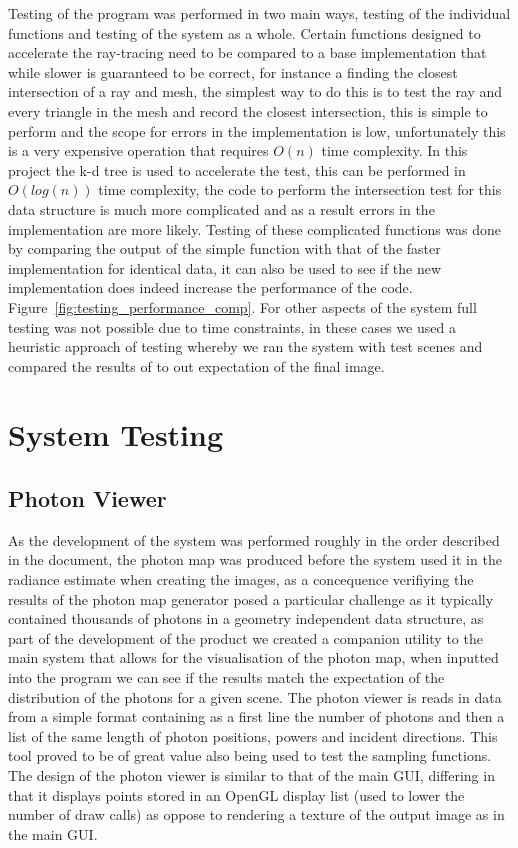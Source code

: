Testing of the program was performed in two main ways, testing of the individual functions and testing of the system as a whole.
Certain functions designed to accelerate the ray-tracing need to be compared to a base implementation that while slower is
guaranteed to be correct, for instance a finding the closest intersection of a ray and mesh, the simplest way to do this
is to test the ray and every triangle in the mesh and record the closest intersection, this is simple to perform and
the scope for errors in the implementation is low, unfortunately this is a very expensive operation that requires $O(n)$
time complexity. In this project the k-d tree is used to accelerate the test, this can be performed in $O(log(n))$ time
complexity, the code to perform the intersection test for this data structure is much more complicated and as a result
errors in the implementation are more likely. Testing of these complicated functions was done by comparing the output
of the simple function with that of the faster implementation for identical data, it can also be
used to see if the new implementation does indeed increase the performance of the code. Figure~\ref{fig:testing_performance_comp}.
For other aspects of the system full testing was not possible due to time constraints, in these cases we used a heuristic
approach of testing whereby we ran the system with test scenes and compared the results of to out expectation of the final image.

\section{System Testing}

\subsection{Photon Viewer}
As the development of the system was performed roughly in the order described in the document, the photon map was produced before the
system used it in the radiance estimate when creating the images, as a concequence verifiying the results of the photon
map generator posed a particular challenge as it typically contained thousands of photons in a geometry independent data structure, as
part of the development of the product we created a companion utility to the main system that allows for the visualisation of the
photon map, when inputted into the program we can see if the results match the expectation of the distribution of the photons for a
given scene. The photon viewer is reads in data from a simple format containing as a first line the number of photons and then
a list of the same length of photon positions, powers and incident directions. This tool proved to be of great value also being used
to test the sampling functions. The design of the photon viewer is similar to that of the main GUI, differing in that it displays points
stored in an OpenGL display list \cite{khronos:2014:online}  (used to lower the number of draw calls) as oppose to rendering a
texture of the output image as in the main GUI.


